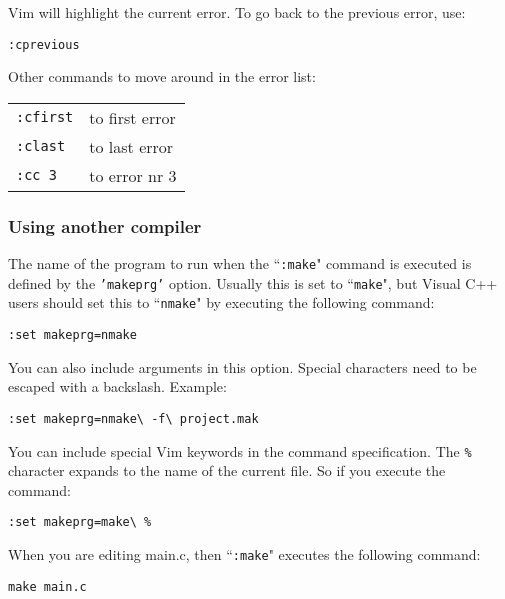 Vim will highlight the current error.
To go back to the previous error, use:

\begin{Verbatim}[samepage=true]
 :cprevious
\end{Verbatim}

Other commands to move around in the error list:

\begin{center} \begin{tabular}{l l}
				\texttt{:cfirst} & to first error \\
				\texttt{:clast} & to last error \\
				\texttt{:cc 3} & to error nr 3 \\
\end{tabular} \end{center}

\subsubsection{Using another compiler}
The name of the program to run when the ``\texttt{:make}" command is executed is defined by the \texttt{'makeprg'} option.
Usually this is set to ``\texttt{make}", but Visual C++ users should set this to ``\texttt{nmake}" by executing the following command:

\begin{Verbatim}[samepage=true]
 :set makeprg=nmake
\end{Verbatim}

You can also include arguments in this option.
Special characters need to be escaped with a backslash.
Example:

\begin{Verbatim}[samepage=true]
 :set makeprg=nmake\ -f\ project.mak
\end{Verbatim}

You can include special Vim keywords in the command specification.
The \texttt{\%} character expands to the name of the current file.
So if you execute the command:

\begin{Verbatim}[samepage=true]
 :set makeprg=make\ %
\end{Verbatim}

When you are editing main.c, then ``\texttt{:make}" executes the following command:

\begin{Verbatim}[samepage=true]
 make main.c
\end{Verbatim}

